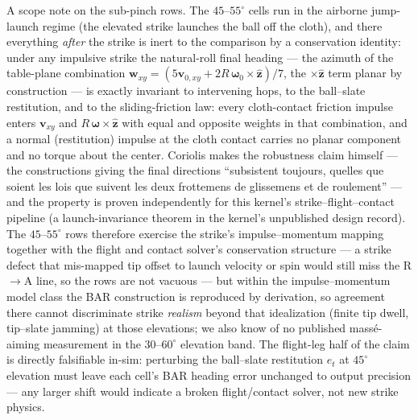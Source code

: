 A scope note on the sub-pinch rows. The $45$--$55^\circ$ cells run in
the airborne jump-launch regime (the elevated strike launches the ball
off the cloth), and there everything \emph{after} the strike is inert to
the comparison by a conservation identity: under any impulsive strike
the natural-roll final heading --- the azimuth of the table-plane
combination $\mathbf{w}_{xy} = (5\mathbf{v}_{0,xy} +
2R\,\boldsymbol{\omega}_0 \times \hat{\mathbf{z}})/7$, the
$\times\hat{\mathbf{z}}$ term planar by construction --- is exactly
invariant to intervening hops, to the ball--slate restitution, and to
the sliding-friction law: every cloth-contact friction impulse enters
$\mathbf{v}_{xy}$ and $R\,\boldsymbol{\omega}\times\hat{\mathbf{z}}$
with equal and opposite weights in that combination, and a normal
(restitution) impulse at the cloth contact carries no planar component
and no torque about the center. Coriolis makes the robustness claim
himself --- the constructions giving the final directions ``subsistent
toujours, quelles que soient les lois que suivent les deux frottemens
de glissemens et de roulement'' \citep[quoted in][]{bouleau2006coriolis}
--- and the property is proven independently for this kernel's
strike--flight--contact pipeline (a launch-invariance theorem in the
kernel's unpublished design record). The $45$--$55^\circ$ rows therefore exercise
the strike's impulse--momentum mapping together with the flight and
contact solver's conservation structure --- a strike defect that
mis-mapped tip offset to launch velocity or spin would still miss the
R$\to$A line, so the rows are not vacuous --- but within the
impulse--momentum model class the BAR construction is reproduced by
derivation, so agreement there cannot discriminate strike \emph{realism}
beyond that idealization (finite tip dwell, tip--slate jamming) at those
elevations; we also know of no published mass\'e-aiming measurement in
the $30$--$60^\circ$ elevation band. The flight-leg half of the claim is
directly falsifiable in-sim: perturbing the ball--slate restitution
$e_t$ at $45^\circ$ elevation must leave each cell's BAR heading error
unchanged to output precision --- any larger shift would indicate a
broken flight/contact solver, not new strike physics.

